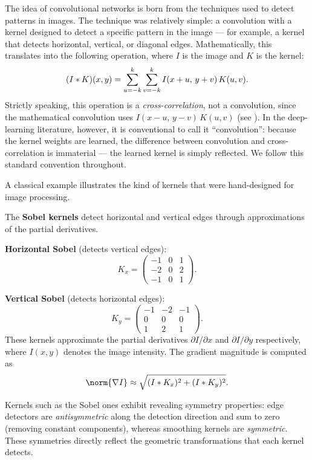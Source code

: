 The idea of convolutional networks is born from the techniques used to detect
patterns in images. The technique was relatively simple: a convolution with a
kernel designed to detect a specific pattern in the image --- for example, a
kernel that detects horizontal, vertical, or diagonal edges. Mathematically,
this translates into the following operation, where $I$ is the image and $K$ is
the kernel:
\begin{equation}
  (I * K)(x,y) = \sum_{u=-k}^{k}\sum_{v=-k}^{k} I(x+u,\, y+v)\, K(u,v).
  \label{eq:grids:convolution2d}
\end{equation}
Strictly speaking, this operation is a \emph{cross-correlation}, not a
convolution, since the mathematical convolution uses $I(x-u,\,y-v)\,K(u,v)$
(see ). In the deep-learning literature, however,
it is conventional to call it ``convolution'': because the kernel weights are
learned, the difference between convolution and cross-correlation is immaterial
--- the learned kernel is simply reflected. We follow this standard convention
throughout.

A classical example illustrates the kind of kernels that were hand-designed for
image processing.

\begin{example}
\label{ex:grids:sobel}
The \textbf{Sobel kernels} detect horizontal and vertical edges through
approximations of the partial derivatives.

\textbf{Horizontal Sobel} (detects vertical edges):
\[
K_x = \begin{pmatrix} -1 & 0 & 1 \\ -2 & 0 & 2 \\ -1 & 0 & 1 \end{pmatrix}.
\]

\textbf{Vertical Sobel} (detects horizontal edges):
\[
K_y = \begin{pmatrix} -1 & -2 & -1 \\ 0 & 0 & 0 \\ 1 & 2 & 1 \end{pmatrix}.
\]
These kernels approximate the partial derivatives $\partial I/\partial x$ and
$\partial I/\partial y$ respectively, where $I(x,y)$ denotes the image
intensity. The gradient magnitude is computed as
\[
  \norm{\nabla I} \approx \sqrt{(I \conv K_x)^2 + (I \conv K_y)^2}.
\]
\end{example}

Kernels such as the Sobel ones exhibit revealing symmetry properties: edge
detectors are \emph{antisymmetric} along the detection direction and sum to zero
(removing constant components), whereas smoothing kernels are \emph{symmetric}.
These symmetries directly reflect the geometric transformations that each kernel
detects.

